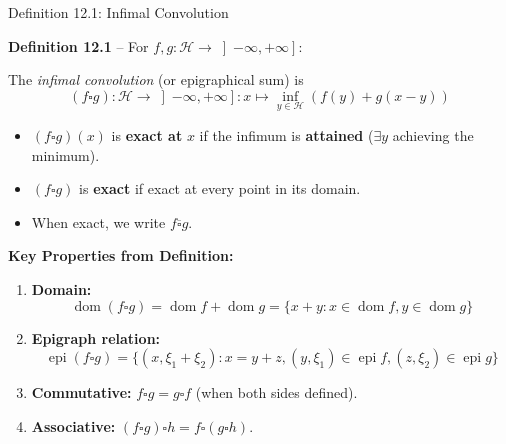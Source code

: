 \documentclass[aspectratio=169,10pt]{beamer}
\newcommand{\cH}{\mathcal{H}}
\newcommand{\dom}{\operatorname{dom}}
\newcommand{\epi}{\operatorname{epi}}
\newcommand{\co}{\square}
\begin{document}
\begin{frame}[allowframebreaks]{Definition 12.1: Infimal Convolution}

  \textbf{Definition 12.1} -- For $f, g: \cH \to \left]-\infty, +\infty\right]$:

  The \textit{infimal convolution} (or epigraphical sum) is
  \begin{equation}
    (f \co g): \cH \to \left]-\infty, +\infty\right] : x \mapsto \inf_{y \in \cH} \left( f(y) + g(x-y) \right)
  \end{equation}

  \begin{itemize}
    \item $(f \co g)(x)$ is \textbf{exact at} $x$ if the infimum is
      \textbf{attained} ($\exists y$ achieving the minimum).
    \item $(f \co g)$ is \textbf{exact} if exact at every point in its domain.
    \item When exact, we write $f \overline{\co} g$.
  \end{itemize}

  \framebreak

  \textbf{Key Properties from Definition:}

  \begin{enumerate}
    \item[(i)] \textbf{Domain:}
    \[
      \dom(f \co g) = \dom f + \dom g = \{ x + y : x \in \dom f, y \in \dom g \}
    \]

    \item[(ii)] \textbf{Epigraph relation:}
    \[
      \epi(f \co g) = \{ (x, \xi_1 + \xi_2) : x = y + z, (y,\xi_1) \in \epi f, (z,\xi_2) \in \epi g \}
    \]

    \item[(iii)] \textbf{Commutative:} $f \co g = g \co f$ (when both sides defined).

    \item[(iv)] \textbf{Associative:} $(f \co g) \co h = f \co (g \co h)$.
  \end{enumerate}

\end{frame}
\end{document}
